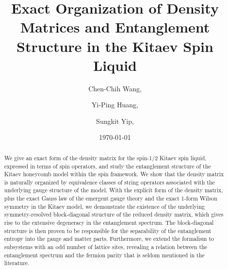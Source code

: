 \documentclass[
reprint,
superscriptaddress,
amsmath,amssymb,
aps,
prb,
floatfix,
]{revtex4-2}
\theoremstyle{definition}
\begin{document}

\title{Exact Organization of Density Matrices and Entanglement Structure in the Kitaev Spin Liquid}

\author{Chen-Chih Wang, 
}

\author{Yi-Ping Huang, }




\author{Sungkit Yip, }



\date{\today}

\begin{abstract}
We give an exact form of the density matrix for the spin-1/2 Kitaev spin liquid, expressed in terms of spin operators, and study the entanglement structure of the Kitaev honeycomb model within the spin framework. 
%
We show that the density matrix is naturally organized by equivalence classes of string operators associated with the underlying gauge structure of the model.
%
With the explicit form of the density matrix, plus the exact Gauss law of the emergent gauge theory and the exact 1-form Wilson symmetry in the Kitaev model, we demonstrate the existence of the underlying symmetry-resolved block-diagonal structure of the reduced density matrix, which gives rise to the extensive degeneracy in the entanglement spectrum. 
%
The block-diagonal structure is then proven to be responsible for the separability of the entanglement entropy into the gauge and matter parts.
%
Furthermore, we extend the formalism to subsystems with an odd number of lattice sites, revealing a relation between the entanglement spectrum and the fermion parity that is seldom mentioned in the literature.


\end{abstract}
\end{document}
